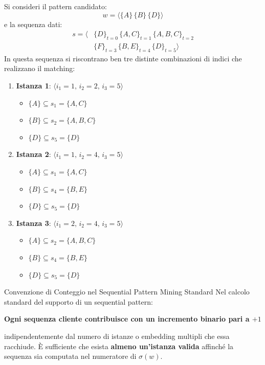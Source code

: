 \begin{example}
Si consideri il pattern candidato:
\begin{equation*}
w = \langle \{A\} \, \{B\} \, \{D\} \rangle
\end{equation*}
e la sequenza dati:
\begin{equation}
\begin{split}
s = \langle &\{D\}_{t=0} \, \{A, C\}_{t=1} \, \{A, B, C\}_{t=2} \\
&\{F\}_{t=3} \, \{B, E\}_{t=4} \, \{D\}_{t=5} \rangle
\end{split}
\end{equation}
In questa sequenza si riscontrano ben tre distinte combinazioni di indici che realizzano il matching:
\begin{enumerate}
    \item \textbf{Istanza 1}: $\langle i_1 = 1, \, i_2 = 2, \, i_3 = 5 \rangle$
    \begin{itemize}[noitemsep]
        \item $\{A\} \subseteq s_1 = \{A, C\}$
        \item $\{B\} \subseteq s_2 = \{A, B, C\}$
        \item $\{D\} \subseteq s_5 = \{D\}$
    \end{itemize}
    \item \textbf{Istanza 2}: $\langle i_1 = 1, \, i_2 = 4, \, i_3 = 5 \rangle$
    \begin{itemize}[noitemsep]
        \item $\{A\} \subseteq s_1 = \{A, C\}$
        \item $\{B\} \subseteq s_4 = \{B, E\}$
        \item $\{D\} \subseteq s_5 = \{D\}$
    \end{itemize}
    \item \textbf{Istanza 3}: $\langle i_1 = 2, \, i_2 = 4, \, i_3 = 5 \rangle$
    \begin{itemize}[noitemsep]
        \item $\{A\} \subseteq s_2 = \{A, B, C\}$
        \item $\{B\} \subseteq s_4 = \{B, E\}$
        \item $\{D\} \subseteq s_5 = \{D\}$
    \end{itemize}
\end{enumerate}
\end{example}

\begin{alertblock}{Convenzione di Conteggio nel Sequential Pattern Mining Standard}
    Nel calcolo standard del supporto di un sequential pattern:
    \begin{center}
    \textbf{Ogni sequenza cliente contribuisce con un incremento binario pari a $+1$}
    \end{center}
    indipendentemente dal numero di istanze o embedding multipli che essa racchiude. È sufficiente che esista \textbf{almeno un'istanza valida} affinché la sequenza sia computata nel numeratore di $\sigma(w)$.
\end{alertblock}

